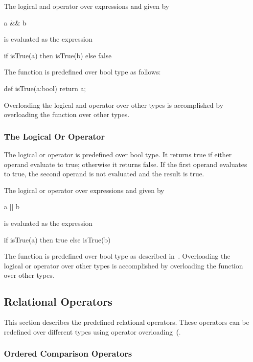 The logical and operator over expressions  and  given
by
\begin{chapel}
a && b
\end{chapel}
is evaluated as the expression
\begin{chapel}
if isTrue(a) then isTrue(b) else false
\end{chapel}

The function  is predefined over bool type as follows:
\begin{chapel}
def isTrue(a:bool) return a;
\end{chapel}
Overloading the logical and operator over other types is accomplished
by overloading the  function over other types.

\subsubsection{The Logical Or Operator}
\label{Logical_Or_Operators}

The logical or operator is predefined over bool type.  It returns
true if either operand evaluate to true; otherwise it returns false.
If the first operand evaluates to true, the second operand is not
evaluated and the result is true.

The logical or operator over expressions  and  given
by
\begin{chapel}
a || b
\end{chapel}
is evaluated as the expression
\begin{chapel}
if isTrue(a) then true else isTrue(b)
\end{chapel}

The function  is predefined over bool type as described
in~.  Overloading the logical or operator
over other types is accomplished by overloading the 
function over other types.

\subsection{Relational Operators}
\label{Relational_Operators}

This section describes the predefined relational operators.  These
operators can be redefined over different types using operator
overloading~(.

\subsubsection{Ordered Comparison Operators}
\label{Ordered_Comparison_Operators}

